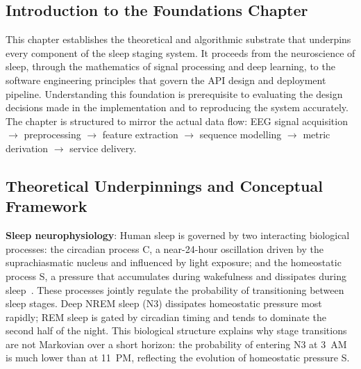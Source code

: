 \documentclass[10pt]{article}
\begin{document}
\subsection{Introduction to the Foundations Chapter}
\label{sec:introFoundation}

This chapter establishes the theoretical and algorithmic substrate that underpins every component of the sleep staging system. It proceeds from the neuroscience of sleep, through the mathematics of signal processing and deep learning, to the software engineering principles that govern the API design and deployment pipeline. Understanding this foundation is prerequisite to evaluating the design decisions made in the implementation and to reproducing the system accurately. The chapter is structured to mirror the actual data flow: EEG signal acquisition $\rightarrow$ preprocessing $\rightarrow$ feature extraction $\rightarrow$ sequence modelling $\rightarrow$ metric derivation $\rightarrow$ service delivery.

\subsection{Theoretical Underpinnings and Conceptual Framework}
\label{sec:theoryFramework}

\textbf{Sleep neurophysiology}: Human sleep is governed by two interacting biological processes: the circadian process C, a near-24-hour oscillation driven by the suprachiasmatic nucleus and influenced by light exposure; and the homeostatic process S, a pressure that accumulates during wakefulness and dissipates during sleep~\cite{borbely1982two}. These processes jointly regulate the probability of transitioning between sleep stages. Deep NREM sleep (N3) dissipates homeostatic pressure most rapidly; REM sleep is gated by circadian timing and tends to dominate the second half of the night. This biological structure explains why stage transitions are not Markovian over a short horizon: the probability of entering N3 at 3~AM is much lower than at 11~PM, reflecting the evolution of homeostatic pressure S.
\end{document}
